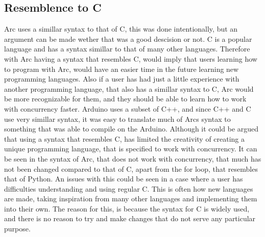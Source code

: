 \subsection{Resemblence to C}
Arc uses a simillar syntax to that of C, this was done intentionally, but an argument can be made wether that was a good descision or not. C is a popular language and has a syntax simillar to that of many other languages. Therefore with Arc having a syntax that resembles C, would imply that users learning how to program with Arc, would have an easier time in the future learning new programming languages. Also if a user has had just a little experience with another programming language, that also has a simillar syntax to C, Arc would be more recognizable for them, and they should be able to learn how to work with concurrency faster. Arduino uses a subset of C++, and since C++ and C use very simillar syntax, it was easy to translate much of Arcs syntax to something that was able to compile on the Arduino.
Although it could be argued that using a syntax that resembles C, has limited the creativity of creating a unique programming language, that is specified to work with concurrency. It can be seen in the syntax of Arc, that does not work with concurrency, that much has not been changed compared to that of C, apart from the for loop, that resembles that of Python. An issues with this could be seen in a case where a user has difficulties understanding and using regular C. This is often how new languages are made, taking inspiration from many other languages and implementing them into their own. The reason for this, is because the syntax for C is widely used, and there is no reason to try and make changes that do not serve any particular purpose. 

